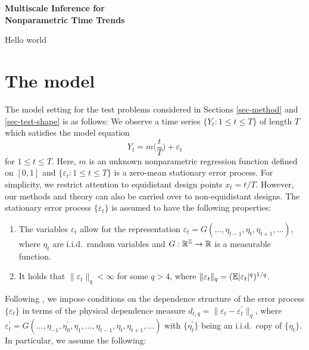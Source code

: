 \documentclass[a4paper,12pt]{article}
\numberwithin{equation}{section}
\begin{document}
\begin{center}
{\LARGE \textbf{Multiscale Inference for}} \\[0.35cm]
{\LARGE \textbf{Nonparametric Time Trends}}
\end{center}

Hello world

\section{The model}\label{sec-model}


The model setting for the test problems considered in Sections \ref{sec-method} and \ref{sec-test-shape} is as follows: We observe a time series $\{Y_t: 1 \le t \le T \}$ of length $T$ which satisfies the model equation 
\begin{equation}\label{model1}
Y_t = m \Big( \frac{t}{T} \Big) + \varepsilon_t 
\end{equation}
for $1 \le t \le T$. Here, $m$ is an unknown nonparametric regression function defined on $[0,1]$ and $\{ \varepsilon_t: 1 \le t \le T \}$ is a zero-mean stationary error process. For simplicity, we restrict attention to equidistant design points $x_t = t/T$. However, our methods and theory can also be carried over to non-equidistant designs. The stationary error process $\{\varepsilon_t\}$ is assumed to have the following properties: 
\begin{enumerate}[label=(C\arabic*),leftmargin=1.05cm]

\item \label{C-err1} The variables $\varepsilon_t$ allow for the representation $\varepsilon_t = G(\ldots,\eta_{t-1},\eta_t,\eta_{t+1},\ldots)$, where $\eta_t$ are i.i.d.\ random variables and $G: \mathbb{R}^{\mathbb{Z}} \rightarrow \mathbb{R}$ is a measurable function. 

\item \label{C-err2} It holds that $\| \varepsilon_t \|_q < \infty$ for some $q > 4$, where $\| \varepsilon_t \|_q = (\mathbb{E}|\varepsilon_t|^q)^{1/q}$. 

\end{enumerate}
Following \cite{Wu2005}, we impose conditions on the dependence structure of the error process $\{\varepsilon_t\}$ in terms of the physical dependence measure $d_{t,q} = \| \varepsilon_t - \varepsilon_t^\prime \|_q$, where $\varepsilon_t^\prime = G(\ldots,\eta_{-1},\eta_0^\prime,\eta_1,\ldots,\eta_{t-1},\eta_t,\eta_{t+1},\ldots)$ with $\{\eta_t^\prime\}$ being an i.i.d.\ copy of $\{\eta_t\}$. In particular, we assume the following: 
\end{document}
